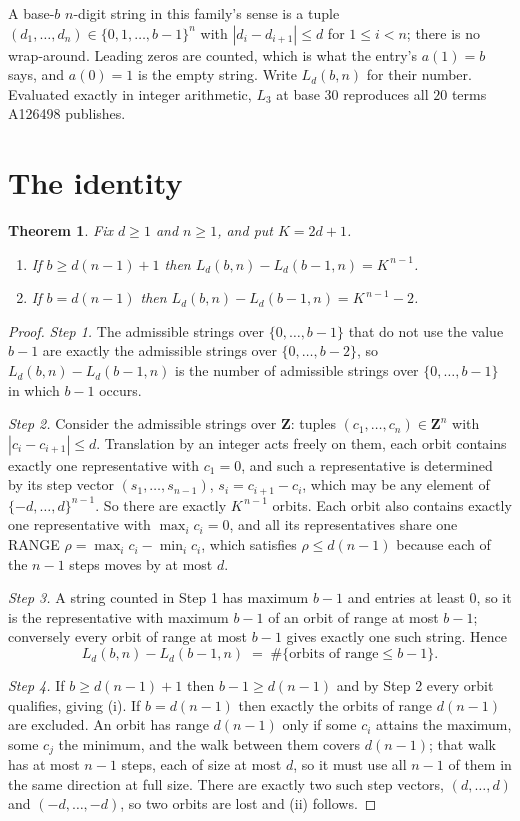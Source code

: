 \documentclass[11pt,a4paper]{article}
\theoremstyle{plain}
\newtheorem{theorem}{Theorem}
\theoremstyle{definition}
\begin{document}
A base-$b$ $n$-digit string in this family's sense is a tuple
$(d_1,\dots,d_n)\in\{0,1,\dots,b-1\}^{n}$ with $|d_i-d_{i+1}|\le d$ for $1\le i<n$; there
is no wrap-around. Leading zeros are counted, which is what the entry's $a(1)=b$ says, and
$a(0)=1$ is the empty string. Write $L_d(b,n)$ for their number. Evaluated exactly in integer
arithmetic, $L_{3}$ at base $30$ reproduces all $20$ terms A126498 publishes.

\section{The identity}

\begin{theorem}
Fix $d\ge1$ and $n\ge1$, and put $K=2d+1$.
\begin{enumerate}
\item[(i)] If $b\ge d(n-1)+1$ then $L_d(b,n)-L_d(b-1,n)=K^{\,n-1}$.
\item[(ii)] If $b=d(n-1)$ then $L_d(b,n)-L_d(b-1,n)=K^{\,n-1}-2$.
\end{enumerate}
\end{theorem}

\begin{proof}
\emph{Step 1.} The admissible strings over $\{0,\dots,b-1\}$ that do not use the value $b-1$
are exactly the admissible strings over $\{0,\dots,b-2\}$, so $L_d(b,n)-L_d(b-1,n)$ is the
number of admissible strings over $\{0,\dots,b-1\}$ in which $b-1$ occurs.

\emph{Step 2.} Consider the admissible strings over $\mathbf{Z}$: tuples
$(c_1,\dots,c_n)\in\mathbf{Z}^{n}$ with $|c_i-c_{i+1}|\le d$. Translation by an integer acts
freely on them, each orbit contains exactly one representative with $c_1=0$, and such a
representative is determined by its step vector $(s_1,\dots,s_{n-1})$, $s_i=c_{i+1}-c_i$,
which may be any element of $\{-d,\dots,d\}^{n-1}$. So there are exactly $K^{\,n-1}$ orbits.
Each orbit also contains exactly one representative with $\max_i c_i=0$, and all its
representatives share one RANGE $\rho=\max_ic_i-\min_ic_i$, which satisfies
$\rho\le d(n-1)$ because each of the $n-1$ steps moves by at most $d$.

\emph{Step 3.} A string counted in Step 1 has maximum $b-1$ and entries at least $0$, so it is
the representative with maximum $b-1$ of an orbit of range at most $b-1$; conversely every orbit
of range at most $b-1$ gives exactly one such string. Hence
\[
L_d(b,n)-L_d(b-1,n)\;=\;\#\{\text{orbits of range}\le b-1\} .
\]

\emph{Step 4.} If $b\ge d(n-1)+1$ then $b-1\ge d(n-1)$ and by Step 2 every orbit qualifies,
giving (i). If $b=d(n-1)$ then exactly the orbits of range $d(n-1)$ are excluded. An orbit has
range $d(n-1)$ only if some $c_i$ attains the maximum, some $c_j$ the minimum, and the walk
between them covers $d(n-1)$; that walk has at most $n-1$ steps, each of size at most $d$, so it
must use all $n-1$ of them in the same direction at full size. There are exactly two such step
vectors, $(d,\dots,d)$ and $(-d,\dots,-d)$, so two orbits are lost and (ii) follows.
\end{proof}
\end{document}
